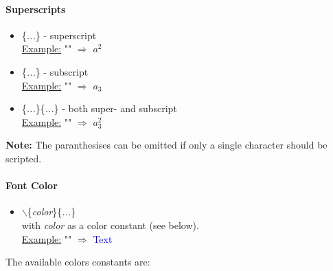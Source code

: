 \paragraph{Superscripts}
  \begin{itemize}
    \item \codename{\^}\{\textit{...}\} - superscript\\
          \underline{Example:} "" $\Rightarrow$ $a^2$
    \item \codename{\_}\{\textit{...}\} - subscript\\
          \underline{Example:} "" $\Rightarrow$ $a_3$
    \item \codename{\_}\{\textit{...}\}\codename{\^}\{\textit{...}\} - both super- and subscript\\
          \underline{Example:} "" $\Rightarrow$ $a^2_3$
  \end{itemize}
\textbf{Note:} The paranthesises can be omitted if only a single character should be scripted.

\paragraph{Font Color}
  \begin{itemize}
    \item $\backslash$\{\textit{color}\}\{\textit{...}\}\\
          with \textit{color} as a color constant (see below).\\
          \underline{Example:} "" $\Rightarrow$ \textcolor{blue}{Text} \normalsize{ }
  \end{itemize}

The available colors constants are:\\


